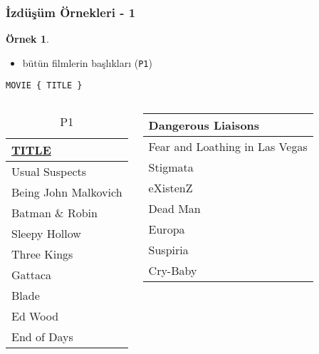 \documentclass[dvipsnames]{beamer}
\theoremstyle{definition}
\theoremstyle{example}
\newtheorem{ornek}[theorem]{Örnek}
\theoremstyle{plain}
\begin{document}
\begin{frame}[fragile]
  \frametitle{İzdüşüm Örnekleri - 1}

  \begin{ornek}
    \begin{itemize}
      \item bütün filmlerin başlıkları (\texttt{P1})
    \end{itemize}

    \begin{lstlisting}
MOVIE { TITLE }
    \end{lstlisting}

    \pause
    \vspace{-10pt}
    \begin{columns}[b]
      \begin{tiny}
      \begin{table}
        \caption{P1}
        \begin{tabular}{|l|}\hline
\underline{TITLE}             \\[2pt]\hline\hline
Usual Suspects                \\\hline
Being John Malkovich          \\\hline
Batman \& Robin               \\\hline
Sleepy Hollow                 \\\hline
Three Kings                   \\\hline
Gattaca                       \\\hline
Blade                         \\\hline
Ed Wood                       \\\hline
End of Days                   \\\hline
        \end{tabular}
      \end{table}
      \end{tiny}

      \begin{tiny}
      \begin{table}
        \begin{tabular}{|l|}\hline
Dangerous Liaisons            \\\hline
Fear and Loathing in Las Vegas\\\hline
Stigmata                      \\\hline
eXistenZ                      \\\hline
Dead Man                      \\\hline
Europa                        \\\hline
Suspiria                      \\\hline
Cry-Baby                      \\\hline
        \end{tabular}
      \end{table}
      \end{tiny}
    \end{columns}
  \end{ornek}
\end{frame}
\end{document}
